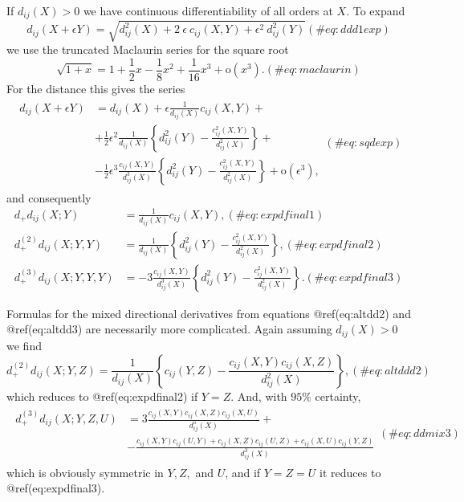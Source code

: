 \documentclass[
  12pt,
  letterpaper,
  DIV=11,
  numbers=noendperiod]{scrreprt}
\theoremstyle{remark}
\begin{document}
If \(d_{ij}(X)>0\) we have continuous differentiability of all orders at
\(X\). To expand \begin{equation}
d_{ij}(X+\epsilon Y)=\sqrt{d_{ij}^2(X)+2\ \epsilon\ c_{ij}(X,Y)+\epsilon^2\ d_{ij}^2(Y)}
(\#eq:ddd1exp)
\end{equation} we use the truncated Maclaurin series for the square root
\begin{equation}
\sqrt{1+x}=1+\frac12x-\frac18x^2+\frac{1}{16}x^3+\text{o}(x^3).
(\#eq:maclaurin)
\end{equation} For the distance this gives the series \begin{align}
\begin{split}
d_{ij}(X+\epsilon Y)&=d_{ij}(X)+\epsilon\frac{1}{d_{ij}(X)}c_{ij}(X,Y)+\\
&+\frac12\epsilon^2\frac{1}{d_{ij}(X)}\left\{d_{ij}^2(Y)-\frac{c_{ij}^2(X,Y)}{d_{ij}^2(X)}\right\}+\\
&-\frac12\epsilon^3\frac{c_{ij}(X,Y)}{d_{ij}^3(X)}\left\{d_{ij}^2(Y)-\frac{c_{ij}^2(X,Y)}{d_{ij}^2(X)}
\right\}+\text{o}(\epsilon^3),
\end{split}(\#eq:sqdexp)
\end{align} and consequently \begin{align}
d_+d_{ij}(X;Y)&=\frac{1}{d_{ij}(X)}c_{ij}(X,Y),(\#eq:expdfinal1)\\
d_+^{(2)}d_{ij}(X;Y,Y)&=\frac{1}{d_{ij}(X)}\left\{d_{ij}^2(Y)-\frac{c_{ij}^2(X,Y)}
{d_{ij}^2(X)}\right\},(\#eq:expdfinal2)\\
d_+^{(3)}d_{ij}(X;Y,Y,Y)&=-3\frac{c_{ij}(X,Y)}{d_{ij}^3(X)}\left\{d_{ij}^2(Y)-\frac{c_{ij}^2(X,Y)}{d_{ij}^2(X)}\right\}.(\#eq:expdfinal3)
\end{align}

Formulas for the mixed directional derivatives from equations
@ref(eq:altdd2) and @ref(eq:altdd3) are necessarily more complicated.
Again assuming \(d_{ij}(X)>0\) we find \begin{equation}
d_+^{(2)}d_{ij}(X;Y,Z)=\frac{1}{d_{ij}(X)}\left\{c_{ij}(Y,Z)-\frac{c_{ij}(X,Y)c_{ij}(X,Z)}{d_{ij}^2(X)}\right\},
(\#eq:altddd2)
\end{equation} which reduces to @ref(eq:expdfinal2) if \(Y=Z\). And,
with \(95\%\) certainty, \begin{align}
\begin{split}
d_+^{(3)}d_{ij}(X;Y,Z,U)&=3\frac{c_{ij}(X,Y)c_{ij}(X,Z)c_{ij}(X,U)}{d_{ij}^5(X)}+\\&-\frac{c_{ij}(X,Y)c_{ij}(U,Y)+
c_{ij}(X,Z)c_{ij}(U,Z)+c_{ij}(X,U)c_{ij}(Y,Z)}{d_{ij}^3(X)}
\end{split}
(\#eq:ddmix3)
\end{align} which is obviously symmetric in \(Y, Z,\) and \(U\), and if
\(Y=Z=U\) it reduces to @ref(eq:expdfinal3).
\end{document}
